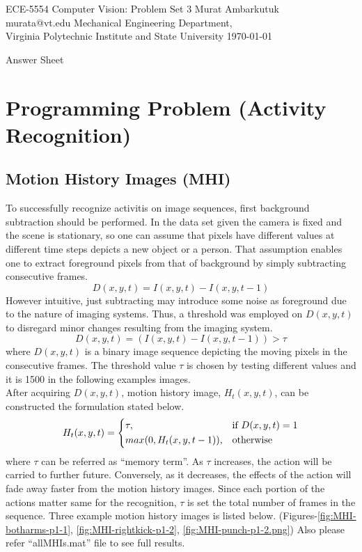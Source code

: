 \documentclass{article}
\begin{document}
\label{Cover}
	\begin{center}
	\large{ECE-5554 Computer Vision: Problem Set 3} 
	\vfill
	Murat Ambarkutuk \\ murata@vt.edu
	\vfill
	Mechanical Engineering Department,\\ Virginia Polytechnic Institute and State University
	\vfill
	\today
	\end{center}
\pagebreak 
\large{Answer Sheet}
\label{Short Answer}

\label{Programming Problem (Activity Recognition)}
\section{Programming Problem (Activity Recognition)}
\subsection{Motion History Images (MHI)}
To successfully recognize activitis on image sequences, first background
subtraction should be performed.
In the data set given the camera is fixed and the scene is stationary, so one
can assume that pixels have different values at different time steps depicts a
new object or a person. That assumption enables one to extract foreground pixels
from that of background by simply subtracting consecutive frames. 
$$D(x,y,t) = I(x,y,t) - I(x,y,t-1)$$
However intuitive, just subtracting may introduce some noise as foreground due
to the nature of imaging systems. Thus, a threshold was employed on $D(x,y,t)$
to disregard minor changes resulting from the imaging system. 
$$D(x,y,t) = (I(x,y,t)-I(x,y,t-1))> \tau$$
where $D(x,y,t)$ is a binary image sequence depicting the moving pixels in the
consecutive frames. The threshold value $\tau$ is chosen by testing different
values and it is 1500 in the following examples images. \\
After acquiring $D(x,y,t)$, motion history image, $H_t(x,y,t)$, can be
constructed the formulation stated below.
$$H_t(x,y,t) =
\begin{dcases}
    \tau, & \text{if } D(x,y,t)=1\\
    max(0,H_t(x,y,t-1)),              & \text{otherwise}
\end{dcases}
$$
where $\tau$ can be referred as ``memory term''. As $\tau$ increases, the action
will be carried to further future. Conversely, as it decreases, the effects of
the action will fade away faster from the motion history images. Since each 
portion of the actions matter same for the recognition, $\tau$ is set the total
number of frames in the sequence. Three example motion history images is listed
below. (Figures-\ref{fig:MHI-botharms-p1-1}, \ref{fig:MHI-rightkick-p1-2},
\ref{fig:MHI-punch-p1-2.png}) Also please refer ``allMHIs.mat'' file to see
full results.
\end{document}
